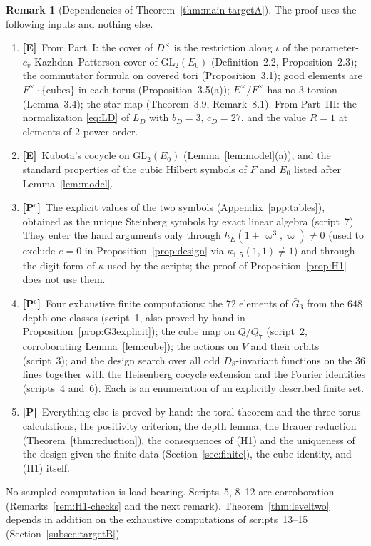 \documentclass[11pt]{article}
\newcommand{\Ptag}{\textnormal{\textbf{[P]}}}
\newcommand{\Pctag}{\textnormal{\textbf{[P$^{\mathrm c}$]}}}
\newcommand{\Etag}{\textnormal{\textbf{[E]}}}
\theoremstyle{plain}
\theoremstyle{definition}
\newtheorem{remark}[theorem]{Remark}
\begin{document}
\begin{remark}[Dependencies of Theorem~\ref{thm:main-targetA}]\label{rem:dependencies}
The proof uses the following inputs and nothing else.
\begin{enumerate}[label=(D\arabic*),leftmargin=*]
\item \Etag\ From Part~I: the cover of $D^\times$ is the restriction
along $\iota$ of the parameter-$c_v$ Kazhdan--Patterson cover of
$\mathrm{GL}_2(E_0)$ (Definition~2.2, Proposition~2.3); the commutator
formula on covered tori (Proposition~3.1); good elements are
$F^\times\cdot\{\text{cubes}\}$ in each torus (Proposition~3.5(a));
$E^\times/F^\times$ has no $3$-torsion (Lemma~3.4); the star map
(Theorem~3.9, Remark~8.1).  From Part~III: the normalization
\eqref{eq:LD} of $L_D$ with $b_D=3$, $c_D=27$, and the value $R=1$ at
elements of $2$-power order.
\item \Etag\ Kubota's cocycle on $\mathrm{GL}_2(E_0)$
(Lemma~\ref{lem:model}(a)), and the standard properties of the cubic
Hilbert symbols of $F$ and $E_0$ listed after Lemma~\ref{lem:model}.
\item \Pctag\ The explicit values of the two symbols
(Appendix~\ref{app:tables}), obtained as the unique Steinberg symbols
by exact linear algebra (script~7).  They enter the hand arguments only
through $h_E(1+\varpi^3,\varpi)\ne0$ (used to exclude $e=0$ in
Proposition~\ref{prop:design} via $\kappa_{1,5}(1,1)\ne1$) and through
the digit form of $\kappa$ used by the scripts; the proof of
Proposition~\ref{prop:H1} does not use them.
\item \Pctag\ Four exhaustive finite computations: the $72$ elements of
$\bar G_3$ from the $648$ depth-one classes (script~1, also proved by
hand in Proposition~\ref{prop:G3explicit}); the cube map on $Q/Q_7$
(script~2, corroborating Lemma~\ref{lem:cube}); the actions on $V$ and
their orbits (script~3); and the design search over all odd
$D_8$-invariant functions on the $36$ lines together with the
Heisenberg cocycle extension and the Fourier identities (scripts~4
and~6).  Each is an enumeration of an explicitly described finite set.
\item \Ptag\ Everything else is proved by hand: the toral theorem and
the three torus calculations, the positivity criterion, the depth
lemma, the Brauer reduction (Theorem~\ref{thm:reduction}), the
consequences of (H1) and the uniqueness of the design given the finite
data (Section~\ref{sec:finite}), the cube identity, and (H1) itself.
\end{enumerate}
No sampled computation is load bearing.  Scripts~5, 8--12 are
corroboration (Remarks~\ref{rem:H1-checks} and the next remark).
Theorem~\ref{thm:leveltwo} depends in addition on the exhaustive
computations of scripts~13--15 (Section~\ref{subsec:targetB}).
\end{remark}
\end{document}
